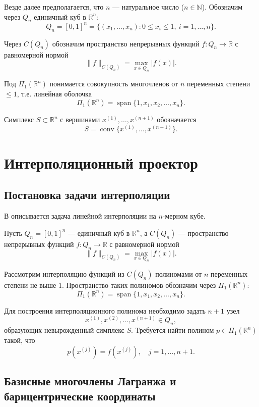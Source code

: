 \documentclass[a4paper,12pt]{article}
\theoremstyle{indented}
\begin{document}
Везде далее предполагается, что $n$ — натуральное число ($n \in \mathbb{N}$). Обозначим через $Q_n$ единичный куб в $\mathbb{R}^n$:
\[
Q_n = [0,1]^n = \{(x_1, \dots, x_n) : 0 \le x_i \le 1,\ i = 1,\dots,n\}.
\]

Через $C(Q_n)$ обозначим пространство непрерывных функций $f : Q_n \to \mathbb{R}$ с равномерной нормой
\[
\|f\|_{C(Q_n)} = \max_{x \in Q_n} |f(x)|.
\]

Под $\Pi_1(\mathbb{R}^n)$ понимается совокупность многочленов от $n$ переменных степени $\le 1$, т.е. линейная оболочка
\[
\Pi_1(\mathbb{R}^n) = \operatorname{span}\{1, x_1, x_2, \dots, x_n\}.
\]

Симплекс $S \subset \mathbb{R}^n$ с вершинами $x^{(1)}, \dots, x^{(n+1)}$ обозначается
\[
S = \operatorname{conv}\{x^{(1)}, \dots, x^{(n+1)}\}.
\]

\section{Интерполяционный проектор}

\subsection{Постановка задачи интерполяции}

В \cite{nevsky_geo} описывается задача линейной интерполяции на $n$-мерном кубе.
\par
Пусть $Q_n = [0,1]^n$ — единичный куб в $\mathbb{R}^n$, а $C(Q_n)$ — пространство непрерывных функций $f: Q_n \to \mathbb{R}$ с равномерной нормой
\[
\|f\|_{C(Q_n)} = \max_{x \in Q_n} |f(x)|.
\]

Рассмотрим интерполяцию функций из $C(Q_n)$ полиномами от $n$ переменных степени не выше $1$. Пространство таких полиномов обозначим через $\Pi_1(\mathbb{R}^n)$:
\[
\Pi_1(\mathbb{R}^n) = \operatorname{span}\{1, x_1, x_2, \dots, x_n\}.
\]

Для построения интерполяционного полинома необходимо задать $n+1$ узел
\[
x^{(1)}, x^{(2)}, \dots, x^{(n+1)} \in Q_n,
\]
образующих невырожденный симплекс $S$. Требуется найти полином $p \in \Pi_1(\mathbb{R}^n)$ такой, что
\[
p(x^{(j)}) = f(x^{(j)}), \quad j = 1, \dots, n+1.
\]

\subsection{Базисные многочлены Лагранжа и барицентрические координаты}
\end{document}

